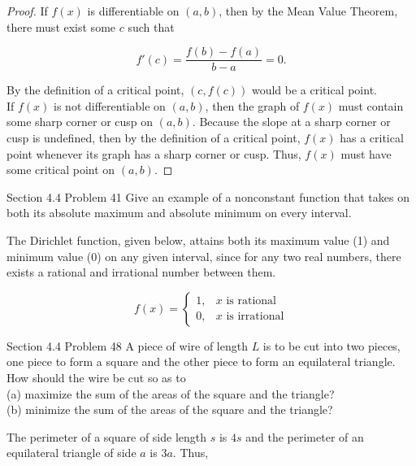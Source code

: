 \documentclass{article}
\begin{document}
    \begin{proof}
        If $f(x)$ is differentiable on $(a,b)$, then by the Mean Value Theorem, there must exist some $c$ such that

        \[
            f'(c) = \frac{f(b)-f(a)}{b-a} = 0.
        \]

        By the definition of a critical point, $(c,f(c))$ would be a critical point. \\

        If $f(x)$ is not differentiable on $(a,b)$, then the graph of $f(x)$ must contain some sharp corner or cusp on $(a,b)$. Because the slope at a sharp corner or cusp is undefined, then by the definition of a
        critical point, $f(x)$ has a critical point whenever its graph has a sharp corner or cusp. Thus, $f(x)$ must have some critical point on $(a,b)$.
    \end{proof}

    \begin{tbhtheorem}{Section 4.4 Problem 41}
        Give an example of a nonconstant function that takes on both its absolute maximum and absolute minimum on every interval.
    \end{tbhtheorem}

    The Dirichlet function, given below, attains both its maximum value (1) and minimum value (0) on any given interval, since for any two real numbers, there exists a rational and irrational number between them.

    \[
        f(x) =
        \begin{cases}
            1,  & x \text{ is rational} \\
            0,  & x \text{ is irrational}
        \end{cases}
    \]

    \begin{tbhtheorem}{Section 4.4 Problem 48}
        A piece of wire of length $L$ is to be cut into two pieces, one piece to form a square and the other piece to form an equilateral triangle. How should the wire be cut so as to \\
        (a) maximize the sum of the areas of the square and the triangle? \\
        (b) minimize the sum of the areas of the square and the triangle?
    \end{tbhtheorem}

    The perimeter of a square of side length $s$ is $4s$ and the perimeter of an equilateral triangle of side $a$ is $3a$. Thus,
\end{document}

